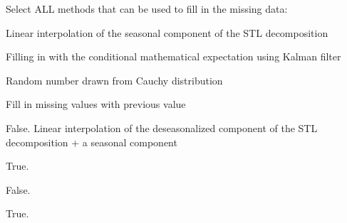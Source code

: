 
\begin{question}
Select ALL methods that can be used to fill in the missing data:
\begin{answerlist}
  \item Linear interpolation of the seasonal component of the STL decomposition
  \item Filling in with the conditional mathematical expectation using Kalman filter
  \item Random number drawn from Cauchy distribution
  \item Fill in missing values with previous value
\end{answerlist}
\end{question}

\begin{solution}
\begin{answerlist}
  \item False. Linear interpolation of the deseasonalized component of the STL decomposition + a seasonal component
  \item True.
  \item False.
  \item True.
\end{answerlist}
\end{solution}

